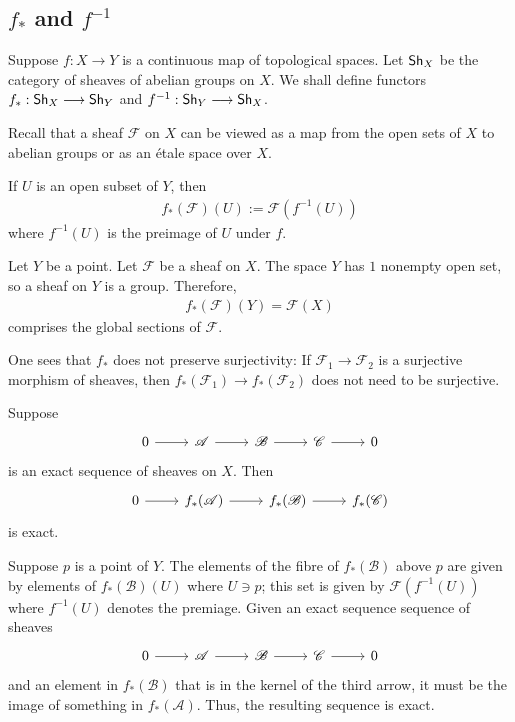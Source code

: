 \documentclass [11 pt, oneside, margin = 1 in] {article}
\begin{document}
\subsection{$f_*$ and $f^{-1}$}
Suppose $f:X\longrightarrow Y$ is a continuous map of topological spaces. Let $\textsf{Sh}_X$ be the category of sheaves of abelian groups on $X$. We shall define functors $f_* : \textsf{Sh}_X \longrightarrow \textsf{Sh}_Y$ and $f^{-1} : \textsf{Sh}_Y \longrightarrow \textsf{Sh}_X$.

Recall that a sheaf $\mathscr{F}$ on $X$ can be viewed as a map from the open sets of $X$ to abelian groups or as an \'etale space over $X$.

If $U$ is an open subset of $Y$, then
\begin{align*}
	f_*(\mathscr{F}) (U) :=  \mathscr{F}(f^{-1}(U))
\end{align*}
where $f^{-1}(U)$ is the preimage of $U$ under $f$.

\begin{example}[ ]\label{}\text{}
Let $Y$ be a point. Let $\mathscr{F}$ be a sheaf on $X$. The space $Y$ has $1$ nonempty open set, so a sheaf on $Y$ is a group. Therefore,
\begin{align*}
	f_*(\mathscr{F}) (Y) =  \mathscr{F}(X)
\end{align*}
comprises the global sections of $\mathscr{F}$.
\end{example}

One sees that $f_*$ does not preserve surjectivity: If $\mathscr{F}_1\longrightarrow \mathscr{F}_2$ is a surjective morphism of sheaves, then $f_*(\mathscr{F}_1)\longrightarrow f_*(\mathscr{F}_2)$ does not need to be surjective.

Suppose
\[
\begin{tikzcd}
	0 \ar[r] &\mathscr{A} \ar[r] &\mathscr{B} \ar[r] &\mathscr{C}\ar[r]&0
\end{tikzcd}
\]
is an exact sequence of sheaves on $X$. Then
\[
\begin{tikzcd}
	0 \ar[r]&f_*(\mathscr{A}) \ar[r] &f_*(\mathscr{B}) \ar[r] &f_*(\mathscr{C})
\end{tikzcd}
\]
is exact. 

Suppose $p$ is a point of $Y$. The elements of the fibre of $f_*(\mathscr{B})$ above $p$ are given by elements of $f_*(\mathscr{B})(U)$ where $U\ni p$; this set is given by $\mathscr{F}(f^{-1}(U))$ where $f^{-1}(U)$ denotes the premiage. Given an exact sequence sequence of sheaves
\[
\begin{tikzcd}
	 0 \ar[r] &\mathscr{A} \ar[r] &\mathscr{B} \ar[r] &\mathscr{C}\ar[r]&0
\end{tikzcd}
\]
and an element in $f_*(\mathscr{B})$ that is in the kernel of the third arrow, it must be the image of something in $f_*(\mathscr{A})$. Thus, the resulting sequence is exact.
\end{document}
